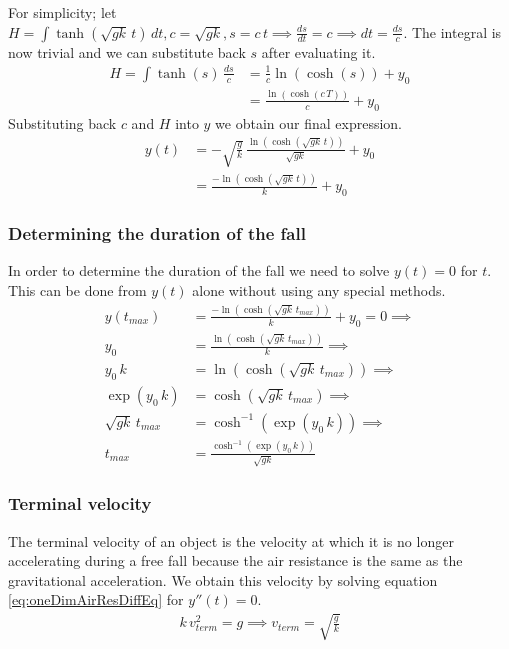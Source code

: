 \documentclass[%
aip,
jmp,
amsmath,amssymb,
reprint,%
]{revtex4-1}
\begin{document}
	For simplicity; let $H = \int \tanh(\sqrt{gk}\,t)\,dt, c = \sqrt{gk}, s = c\,t \implies \frac{ds}{dt} = c \implies dt = \frac{ds}{c}$. The integral is now trivial and we can substitute back $s$ after evaluating it.
	\begin{align}\nonumber
		H = \int \tanh(s)\, \frac{ds}{c} &= \frac{1}{c} \ln(\cosh(s)) + y_0\\\nonumber
		&= \frac{\ln(\cosh(c\,T))}{c}+y_0
	\end{align}
	Substituting back $c$ and $H$ into $y$ we obtain our final expression.
	\begin{align}\nonumber
		y(t) &= -\sqrt{\frac{g}{k}}\,\frac{\ln(\cosh(\sqrt{gk}\,t))}{\sqrt{gk}} + y_0\\\label{eq:oneDimAirRes}
		&= \frac{-\ln(\cosh(\sqrt{gk}\,t))}{k} + y_0
	\end{align}
	\subsubsection{Determining the duration of the fall}
	In order to determine the duration of the fall we need to solve $y(t) = 0$ for $t$. This can be done from $y(t)$ alone without using any special methods.
	\begin{align}\nonumber
		y(t_{max}) &= \frac{-\ln(\cosh(\sqrt{gk}\,t_{max}))}{k} + y_0 = 0 \implies\\\nonumber
		y_0 &= \frac{\ln(\cosh(\sqrt{gk}\,t_{max}))}{k} \implies\\\nonumber
		y_0\,k &= \ln(\cosh(\sqrt{gk}\,t_{max})) \implies\\\nonumber
		\exp(y_0\,k) &= \cosh(\sqrt{gk}\,t_{max}) \implies\\\nonumber
		\sqrt{gk}\,t_{max} &= \cosh^{-1}(\exp(y_0\,k)) \implies\\\label{eq:oneDimAirResTMax}
		t_{max} &= \frac{\cosh^{-1}(\exp(y_0\,k))}{\sqrt{gk}}
	\end{align}
	\subsubsection{Terminal velocity}
	The terminal velocity of an object is the velocity at which it is no longer accelerating during a free fall because the air resistance is the same as the gravitational acceleration. We obtain this velocity by solving equation \eqref{eq:oneDimAirResDiffEq} for $y''(t) = 0$.
	\begin{align}\label{eq:oneDimAirResTerminalVel}
		k\,v_{term}^2 = g \implies v_{term} = \sqrt{\frac{g}{k}}
	\end{align}
\end{document}
